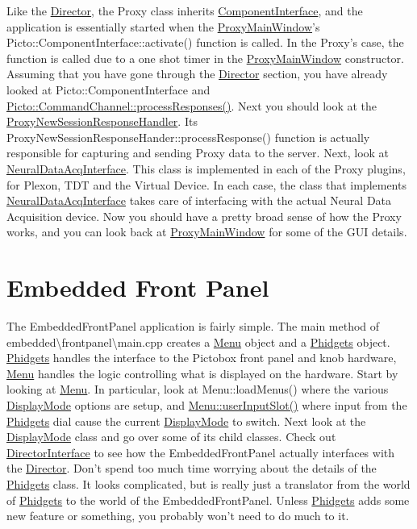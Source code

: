 Like the \hyperlink{class_director}{Director}, the Proxy class inherits \hyperlink{class_component_interface}{Component\-Interface}, and the application is essentially started when the \hyperlink{class_proxy_main_window}{Proxy\-Main\-Window}'s Picto\-::\-Component\-Interface\-::activate() function is called. In the Proxy's case, the function is called due to a one shot timer in the \hyperlink{class_proxy_main_window}{Proxy\-Main\-Window} constructor. Assuming that you have gone through the \hyperlink{class_director}{Director} section, you have already looked at Picto\-::\-Component\-Interface and \hyperlink{class_picto_1_1_command_channel_aafe619791fb542563544ecf50628238b}{Picto\-::\-Command\-Channel\-::process\-Responses()}. Next you should look at the \hyperlink{struct_proxy_new_session_response_handler}{Proxy\-New\-Session\-Response\-Handler}. Its Proxy\-New\-Session\-Response\-Hander\-::process\-Response() function is actually responsible for capturing and sending Proxy data to the server. Next, look at \hyperlink{class_neural_data_acq_interface}{Neural\-Data\-Acq\-Interface}. This class is implemented in each of the Proxy plugins, for Plexon, T\-D\-T and the Virtual Device. In each case, the class that implements \hyperlink{class_neural_data_acq_interface}{Neural\-Data\-Acq\-Interface} takes care of interfacing with the actual Neural Data Acquisition device. Now you should have a pretty broad sense of how the Proxy works, and you can look back at \hyperlink{class_proxy_main_window}{Proxy\-Main\-Window} for some of the G\-U\-I details.\hypertarget{first_code_look_first_look_Embedded}{}\section{Embedded Front Panel}\label{first_code_look_first_look_Embedded}
The Embedded\-Front\-Panel application is fairly simple. The main method of embedded\textbackslash{}frontpanel\textbackslash{}main.\-cpp creates a \hyperlink{class_menu}{Menu} object and a \hyperlink{class_phidgets}{Phidgets} object. \hyperlink{class_phidgets}{Phidgets} handles the interface to the Pictobox front panel and knob hardware, \hyperlink{class_menu}{Menu} handles the logic controlling what is displayed on the hardware. Start by looking at \hyperlink{class_menu}{Menu}. In particular, look at Menu\-::load\-Menus() where the various \hyperlink{class_display_mode}{Display\-Mode} options are setup, and \hyperlink{class_menu_a3a8a0e8b13f44978f239e280d78b38bd}{Menu\-::user\-Input\-Slot()} where input from the \hyperlink{class_phidgets}{Phidgets} dial cause the current \hyperlink{class_display_mode}{Display\-Mode} to switch. Next look at the \hyperlink{class_display_mode}{Display\-Mode} class and go over some of its child classes. Check out \hyperlink{class_director_interface}{Director\-Interface} to see how the Embedded\-Front\-Panel actually interfaces with the \hyperlink{class_director}{Director}. Don't spend too much time worrying about the details of the \hyperlink{class_phidgets}{Phidgets} class. It looks complicated, but is really just a translator from the world of \hyperlink{class_phidgets}{Phidgets} to the world of the Embedded\-Front\-Panel. Unless \hyperlink{class_phidgets}{Phidgets} adds some new feature or something, you probably won't need to do much to it. 